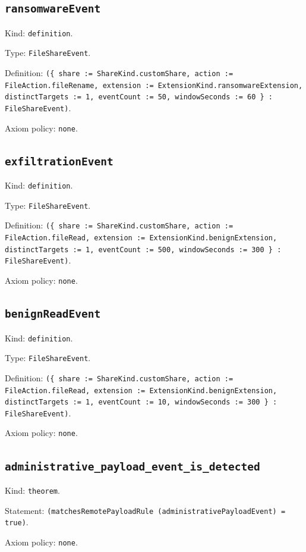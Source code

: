 \documentclass[11pt]{article}
\begin{document}
\subsection*{\texttt{ransomwareEvent}}
\noindent Kind: \texttt{definition}.\par
\noindent Type: \texttt{FileShareEvent}.\par
\noindent Definition: \texttt{(\{ share := ShareKind.customShare, action := FileAction.fileRename, extension := ExtensionKind.ransomwareExtension, distinctTargets := 1, eventCount := 50, windowSeconds := 60 \} : FileShareEvent)}.\par
\noindent Axiom policy: \texttt{none}.\par
\subsection*{\texttt{exfiltrationEvent}}
\noindent Kind: \texttt{definition}.\par
\noindent Type: \texttt{FileShareEvent}.\par
\noindent Definition: \texttt{(\{ share := ShareKind.customShare, action := FileAction.fileRead, extension := ExtensionKind.benignExtension, distinctTargets := 1, eventCount := 500, windowSeconds := 300 \} : FileShareEvent)}.\par
\noindent Axiom policy: \texttt{none}.\par
\subsection*{\texttt{benignReadEvent}}
\noindent Kind: \texttt{definition}.\par
\noindent Type: \texttt{FileShareEvent}.\par
\noindent Definition: \texttt{(\{ share := ShareKind.customShare, action := FileAction.fileRead, extension := ExtensionKind.benignExtension, distinctTargets := 1, eventCount := 10, windowSeconds := 300 \} : FileShareEvent)}.\par
\noindent Axiom policy: \texttt{none}.\par
\subsection*{\texttt{administrative\_payload\_event\_is\_detected}}
\noindent Kind: \texttt{theorem}.\par
\noindent Statement: \texttt{(matchesRemotePayloadRule (administrativePayloadEvent) = true)}.\par
\noindent Axiom policy: \texttt{none}.\par
\end{document}
